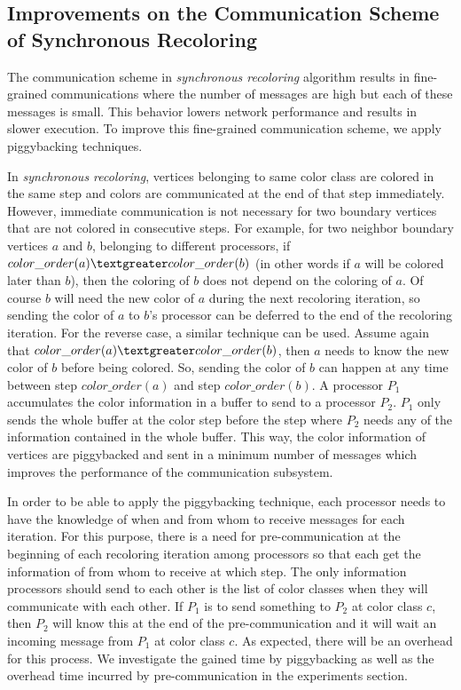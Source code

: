\documentclass{article}
\begin{document}
\subsection{Improvements on the Communication Scheme of Synchronous Recoloring}
\label{sec:improved_comm}

The communication scheme in {\em synchronous recoloring} algorithm
results in fine-grained communications where the number of messages
are high but each of these messages is small. This behavior lowers
network performance and results in slower execution. To improve this
fine-grained communication scheme, we apply piggybacking techniques.

In {\em synchronous recoloring}, vertices belonging to same color
class are colored in the same step and colors are communicated at the
end of that step immediately. However, immediate communication is not
necessary for two boundary vertices that are not colored in
consecutive steps. For example, for two neighbor boundary vertices $a$
and $b$, belonging to different processors, if $color\_order(a)
\textgreater color\_order(b)$ (in other words if $a$ will be colored
later than $b$), then the coloring of $b$ does not depend on the
coloring of $a$. Of course $b$ will need the new color of $a$ during
the next recoloring iteration, so sending the color of $a$ to $b$'s
processor can be deferred to the end of the recoloring iteration.  For
the reverse case, a similar technique can be used. Assume again that
$color\_order(a) \textgreater color\_order(b)$, then $a$ needs to know
the new color of $b$ before being colored. So, sending the color of
$b$ can happen at any time between step $color\_order(a)$ and
step $color\_order(b)$.  A processor $P_1$ accumulates the color
information in a buffer to send to a processor $P_2$. $P_1$ only
sends the whole buffer at the color step before the step where $P_2$
needs any of the information contained in the whole buffer. This way, the color
information of vertices are piggybacked and sent in a minimum number
of messages which improves the performance of the communication subsystem.

In order to be able to apply the piggybacking technique, each
processor needs to have the knowledge of when and from whom
to receive messages for each iteration. For this purpose, there is a need for
pre-communication at the beginning of each recoloring iteration among
processors so that each get the information of from whom
to receive at which step. The only information processors should
send to each other is the list of color classes when they will
communicate with each other. If $P_1$ is to send something to $P_2$ at
color class $c$, then $P_2$ will know this at the end of the
pre-communication and it will wait an incoming message from $P_1$ at color
class $c$. As expected, there will be an overhead for this process. We
investigate the gained time by piggybacking as well as the overhead
time incurred by pre-communication in the experiments section.
\end{document}
